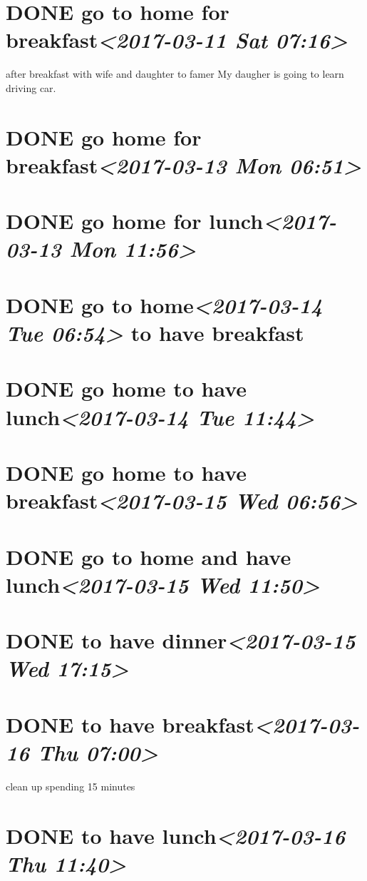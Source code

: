 \documentclass[cyan]{elegantnote}
\begin{document}
\section{{\bfseries\sffamily DONE} go to home for breakfast\textit{<2017-03-11 Sat 07:16>}}
\label{sec:orga386aa6}
after breakfast with wife and daughter to famer
My daugher is going to learn driving car.
\section{{\bfseries\sffamily DONE} go home for breakfast\textit{<2017-03-13 Mon 06:51>}}
\label{sec:org48464d0}
\section{{\bfseries\sffamily DONE} go home for lunch\textit{<2017-03-13 Mon 11:56>}}
\label{sec:org35dc546}
\section{{\bfseries\sffamily DONE} go to home\textit{<2017-03-14 Tue 06:54> } to have breakfast}
\label{sec:orgbe33665}
\section{{\bfseries\sffamily DONE} go home to have lunch\textit{<2017-03-14 Tue 11:44>}}
\label{sec:orgcc09b12}
\section{{\bfseries\sffamily DONE} go home to have breakfast\textit{<2017-03-15 Wed 06:56>}}
\label{sec:org8e66c9b}
\section{{\bfseries\sffamily DONE} go to home and have lunch\textit{<2017-03-15 Wed 11:50>}}
\label{sec:org1a6aa2e}
\section{{\bfseries\sffamily DONE} to have dinner\textit{<2017-03-15 Wed 17:15>}}
\label{sec:org2be735b}
\section{{\bfseries\sffamily DONE} to have breakfast\textit{<2017-03-16 Thu 07:00>}}
\label{sec:org90c1df0}
clean up spending 15 minutes
\section{{\bfseries\sffamily DONE} to have lunch\textit{<2017-03-16 Thu 11:40>}}
\label{sec:org976b3b2}
\end{document}
